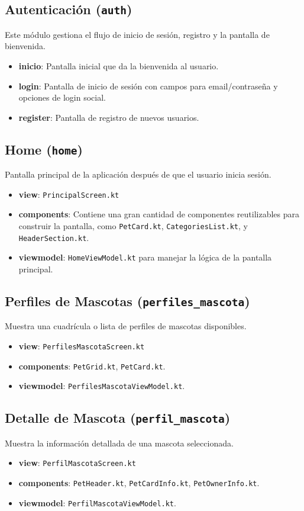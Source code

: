 \documentclass[12pt, a4paper]{article}
\begin{document}
\subsection{Autenticación (\texttt{auth})}
Este módulo gestiona el flujo de inicio de sesión, registro y la pantalla de bienvenida.
\begin{itemize}
    \item \textbf{inicio}: Pantalla inicial que da la bienvenida al usuario.
    \item \textbf{login}: Pantalla de inicio de sesión con campos para email/contraseña y opciones de login social.
    \item \textbf{register}: Pantalla de registro de nuevos usuarios.
\end{itemize}

\subsection{Home (\texttt{home})}
Pantalla principal de la aplicación después de que el usuario inicia sesión.
\begin{itemize}
    \item \textbf{view}: \texttt{PrincipalScreen.kt}
    \item \textbf{components}: Contiene una gran cantidad de componentes reutilizables para construir la pantalla, como \texttt{PetCard.kt}, \texttt{CategoriesList.kt}, y \texttt{HeaderSection.kt}.
    \item \textbf{viewmodel}: \texttt{HomeViewModel.kt} para manejar la lógica de la pantalla principal.
\end{itemize}

\subsection{Perfiles de Mascotas (\texttt{perfiles\_mascota})}
Muestra una cuadrícula o lista de perfiles de mascotas disponibles.
\begin{itemize}
    \item \textbf{view}: \texttt{PerfilesMascotaScreen.kt}
    \item \textbf{components}: \texttt{PetGrid.kt}, \texttt{PetCard.kt}.
    \item \textbf{viewmodel}: \texttt{PerfilesMascotaViewModel.kt}.
\end{itemize}

\subsection{Detalle de Mascota (\texttt{perfil\_mascota})}
Muestra la información detallada de una mascota seleccionada.
\begin{itemize}
    \item \textbf{view}: \texttt{PerfilMascotaScreen.kt}
    \item \textbf{components}: \texttt{PetHeader.kt}, \texttt{PetCardInfo.kt}, \texttt{PetOwnerInfo.kt}.
    \item \textbf{viewmodel}: \texttt{PerfilMascotaViewModel.kt}.
\end{itemize}
\end{document}
